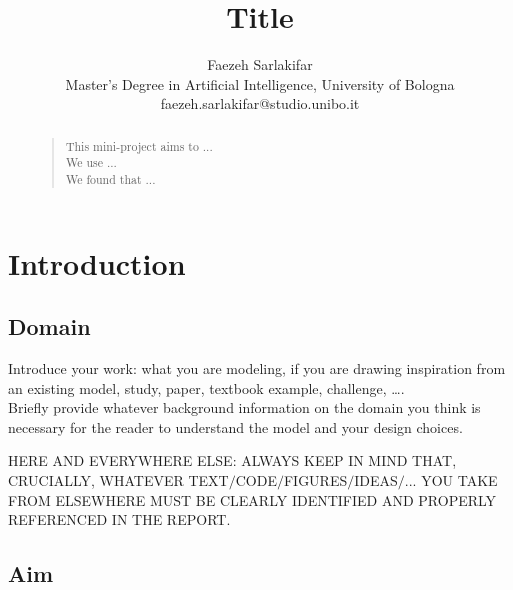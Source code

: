 \documentclass[letterpaper]{article}
\begin{document}
 	
%
\title{Title}
\author{Faezeh Sarlakifar\\
Master's Degree in Artificial Intelligence, University of Bologna\\
faezeh.sarlakifar@studio.unibo.it
}
\maketitle



\begin{abstract}
\begin{quote}

This mini-project aims to ... \\
We use ... \\
We found that ...

\end{quote}
\end{abstract}


\section{Introduction}

\subsection{Domain}

Introduce your work: what you are modeling, if you are drawing inspiration from an existing model, study, paper, textbook example, challenge, \dots.\\
Briefly provide whatever background information on the domain you think is necessary for the reader to understand the model and your design choices.

HERE AND EVERYWHERE ELSE: ALWAYS KEEP IN MIND THAT, CRUCIALLY, WHATEVER TEXT$/$CODE$/$FIGURES$/$IDEAS$/$... YOU TAKE FROM ELSEWHERE MUST BE CLEARLY IDENTIFIED AND PROPERLY REFERENCED IN THE REPORT.


\subsection{Aim}
\end{document}
